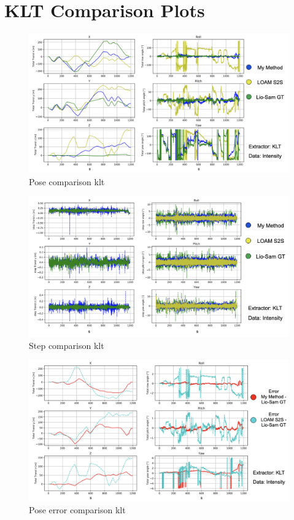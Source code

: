 \section{KLT Comparison Plots}{

    \begin{figure}[ht]
        \centering
        \includegraphics[scale = 0.25]{images/results/pose_klt.png}
        \caption{Pose comparison klt}
        \label{fig:pose_comparison_klt_appendix}
    \end{figure}
    
    \begin{figure}[ht]
        \centering
        \includegraphics[scale = 0.25]{images/results/steps_klt.png}
        \caption{Step comparison klt}
        \label{fig:step_comparison_klt_appendix}
    \end{figure}

    \begin{figure}[ht]
        \centering
        \includegraphics[scale = 0.25]{images/results/pose_error_klt.png}
        \caption{Pose error comparison klt}
        \label{fig:pose_error_comparison_klt_appendix}
    \end{figure}
    
}
